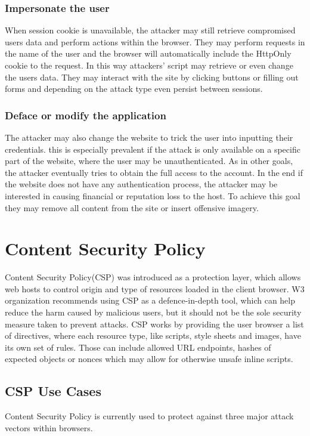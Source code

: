 \subsubsection{Impersonate the user}
When session cookie is unavailable, the attacker may still retrieve compromised users data and perform actions within the browser.
They may perform requests in the name of the user and the browser will automatically include the HttpOnly cookie to the request.
In this way attackers' script may retrieve or even change the users data.
They may interact with the site by clicking buttons or filling out forms and depending on the attack type even persist between sessions.

\subsubsection{Deface or modify the application}
The attacker may also change the website to trick the user into inputting their credentials.
this is especially prevalent if the attack is only available on a specific part of the website, where the user may be unauthenticated.
As in other goals, the attacker eventually tries to obtain the full access to the account.
In the end if the website does not have any authentication process, the attacker may be interested in causing financial or reputation loss to the host.
To achieve this goal they may remove all content from the site or insert offensive imagery.

\section{Content Security Policy}
Content Security Policy(CSP) was introduced as a protection layer, which allows web hosts to control origin and type of resources loaded in the client browser. 
W3 organization recommends using CSP as a defence-in-depth tool, which can help reduce the harm caused by malicious users, but it should not be the sole security measure taken to prevent attacks. \cite{CSPLevel3}
CSP works by providing the user browser a list of directives, where each resource type, like scripts, style sheets and images, have its own set of rules.
Those can include allowed URL endpoints, hashes of expected objects or nonces which may allow for otherwise unsafe inline scripts.

\subsection{CSP Use Cases}
Content Security Policy is currently used to protect against three major attack vectors within browsers.

